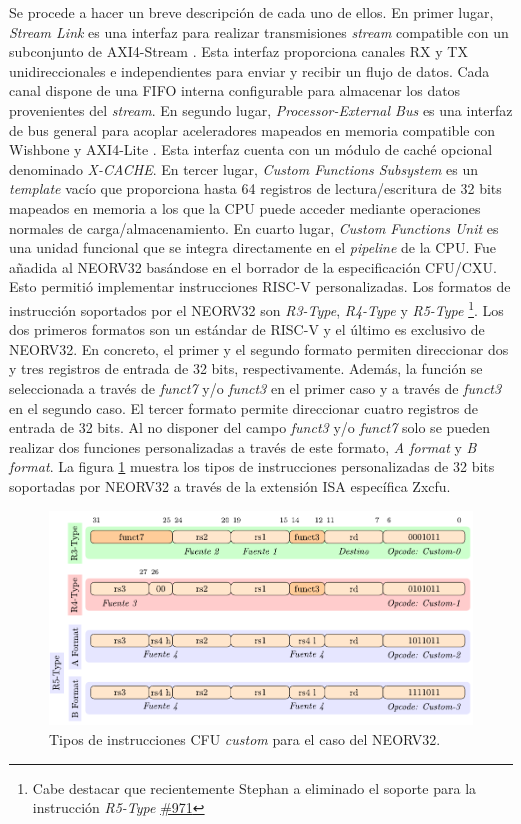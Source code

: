 Se procede a hacer un breve descripción de cada uno de ellos.
En primer lugar, \textit{Stream Link} es una interfaz para realizar transmisiones \textit{stream} compatible con un subconjunto de AXI4-Stream \cite{axi}.
Esta interfaz proporciona canales RX y TX unidireccionales e independientes para enviar y recibir un flujo de datos.
Cada canal dispone de una FIFO interna configurable para almacenar los datos provenientes del \textit{stream}.
En segundo lugar, \textit{Processor-External Bus} es una interfaz de bus general para acoplar aceleradores mapeados en memoria compatible con Wishbone \cite{wb} y AXI4-Lite \cite{axi-lite}.
Esta interfaz cuenta con un módulo de caché opcional denominado \textit{X-CACHE}.
En tercer lugar, \textit{Custom Functions Subsystem} es un \textit{template} vacío que proporciona hasta 64 registros de lectura/escritura de 32 bits mapeados en memoria a los que la CPU puede acceder mediante operaciones normales de carga/almacenamiento.
En cuarto lugar, \textit{Custom Functions Unit} es una unidad funcional que se integra directamente en el \textit{pipeline} de la CPU.
Fue añadida al NEORV32 basándose en el borrador de la especificación CFU/CXU.
Esto permitió implementar instrucciones RISC-V personalizadas. 
Los formatos de instrucción soportados por el NEORV32 son \textit{R3-Type}, \textit{R4-Type} y \textit{R5-Type} \footnote{Cabe destacar que recientemente Stephan a eliminado el soporte para la instrucción \textit{R5-Type} \href{https://github.com/stnolting/neorv32/pull/971}{\#971}}.
Los dos primeros formatos son un estándar de RISC-V y el último es exclusivo de NEORV32. 
En concreto, el primer y el segundo formato permiten direccionar dos y tres registros de entrada de 32 bits, respectivamente. 
Además, la función se seleccionada a través de \textit{funct7} y/o \textit{funct3} en el primer caso y a través de \textit{funct3} en el segundo caso. 
El tercer formato permite direccionar cuatro registros de entrada de 32 bits. 
Al no disponer del campo \textit{funct3} y/o \textit{funct7} solo se pueden realizar dos funciones personalizadas a través de este formato, \textit{A format} y \textit{B format}.  
La figura \ref{fig:ins} muestra los tipos de instrucciones personalizadas de 32 bits soportadas por NEORV32 a través de la extensión ISA específica Zxcfu.

\begin{figure}[h!]
    \centering
    \includegraphics[width=14cm]{Figuras/CFU_INS.pdf}
    \caption{Tipos de instrucciones CFU \textit{custom} para el caso del NEORV32.}
    \label{fig:ins}
\end{figure}

